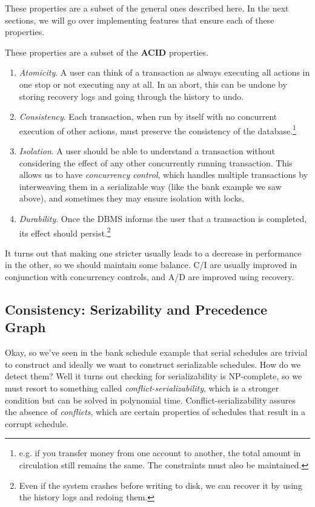   These properties are a subset of the general ones described here. In the next sections, we will go over implementing features that ensure each of these properties. 

  \begin{definition}[ACID]
    These properties are a subset of the \textbf{ACID} properties.
    \begin{enumerate}
      \item \textit{Atomicity}. A user can think of a transaction as always executing all actions in one stop or not executing any at all. In an abort, this can be undone by storing recovery logs and going through the history to undo. 
      \item \textit{Consistency}. Each transaction, when run by itself with no concurrent execution of other actions, must preserve the consistency of the database.\footnote{e.g. if you transfer money from one account to another, the total amount in circulation still remains the same. The constraints must also be maintained. } 
      \item \textit{Isolation}. A user should be able to understand a transaction without considering the effect of any other concurrently running transaction. This allows us to have \textit{concurrency control}, which handles multiple transactions by interweaving them in a serializable way (like the bank example we saw above), and sometimes they may ensure isolation with locks.  

      \item \textit{Durability}. Once the DBMS informs the user that a transaction is completed, its effect should persist.\footnote{Even if the system crashes before writing to disk, we can recover it by using the history logs and redoing them.}
    \end{enumerate}

    It turns out that making one stricter usually leads to a decrease in performance in the other, so we should maintain some balance. C/I are usually improved in conjunction with concurrency controls, and A/D are improved using recovery. 
  \end{definition}

\subsection{Consistency: Serizability and Precedence Graph}

  Okay, so we've seen in the bank schedule example that serial schedules are trivial to construct and ideally we want to construct serializable schedules. How do we detect them? Well it turns out checking for serializability is NP-complete, so we must resort to something called \textit{conflict-serializability}, which is a stronger condition but can be solved in polynomial time. Conflict-serializability assures the absence of \textit{conflicts}, which are certain properties of schedules that result in a corrupt schedule.   

